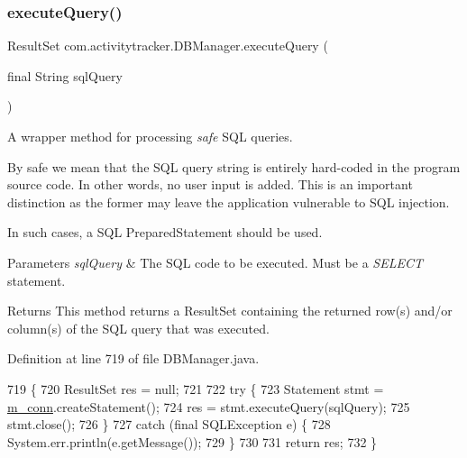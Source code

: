 \mbox{\label{classcom_1_1activitytracker_1_1_d_b_manager_adef71a18dc05536d80e83311841e1953}} 
\subsubsection{\texorpdfstring{execute\+Query()}{executeQuery()}}
{\footnotesize\ttfamily Result\+Set com.\+activitytracker.\+D\+B\+Manager.\+execute\+Query (\begin{DoxyParamCaption}\item[{final String}]{sql\+Query }\end{DoxyParamCaption})\hspace{0.3cm}{\ttfamily [private]}}

A wrapper method for processing {\itshape safe} S\+QL queries.

By safe we mean that the S\+QL query string is entirely hard-\/coded in the program source code. In other words, no user input is added. This is an important distinction as the former may leave the application vulnerable to S\+QL injection.

In such cases, a S\+QL Prepared\+Statement should be used.


\begin{DoxyParams}{Parameters}
{\em sql\+Query} & The S\+QL code to be executed. Must be a {\itshape S\+E\+L\+E\+CT} statement.\\
\hline
\end{DoxyParams}
\begin{DoxyReturn}{Returns}
This method returns a Result\+Set containing the returned row(s) and/or column(s) of the S\+QL query that was executed. 
\end{DoxyReturn}


Definition at line 719 of file D\+B\+Manager.\+java.


\begin{DoxyCode}
719                                                           \{
720         ResultSet res = null;
721 
722         \textcolor{keywordflow}{try} \{
723             Statement stmt = \mbox{\hyperlink{classcom_1_1activitytracker_1_1_d_b_manager_a064088d13ac09eb147fdc19268771521}{m\_conn}}.createStatement();
724             res = stmt.executeQuery(sqlQuery);
725             stmt.close();
726         \}
727         \textcolor{keywordflow}{catch} (\textcolor{keyword}{final} SQLException e) \{
728             System.err.println(e.getMessage());
729         \}
730 
731         \textcolor{keywordflow}{return} res;
732     \}
\end{DoxyCode}
\mbox{\label{classcom_1_1activitytracker_1_1_d_b_manager_a382397e2bdf309901d1c80ff66be69b7}} 
